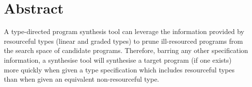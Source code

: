 \begingroup
\let\clearpage\relax
\let\cleardoublepage\relax
\let\cleardoublepage\relax

\chapter*{Abstract}
A type-directed program synthesis tool can leverage the information provided by
resourceful types (linear and graded types) to prune ill-resourced programs from
the search space of candidate programs. Therefore, barring any other
specification information, a synthesise tool will synthesise a target program
(if one exists) more quickly when given a type specification which includes
resourceful types than when given an equivalent non-resourceful type.


\vfill

\endgroup

\vfill
